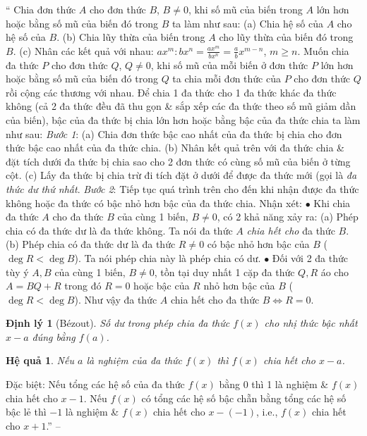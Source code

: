 \documentclass{article}
\numberwithin{equation}{section}
\newtheorem{dinhly}{Định lý}[section]
\newtheorem{hequa}{Hệ quả}[section]
\begin{document}
`` Chia đơn thức $A$ cho đơn thức $B$, $B\ne0$, khi số mũ của biến trong $A$ lớn hơn hoặc bằng số mũ của biến đó trong $B$ ta làm như sau: (a) Chia hệ số của $A$ cho hệ số của $B$. (b) Chia lũy thừa của biến trong $A$ cho lũy thừa của biến đó trong $B$. (c) Nhân các kết quả với nhau: $ax^m:bx^n = \frac{ax^m}{bx^n} = \frac{a}{b}x^{m-n}$, $m\ge n$.  Muốn chia đa thức $P$ cho đơn thức $Q$, $Q\ne0$, khi số mũ của mỗi biến ở đơn thức $P$ lớn hơn hoặc bằng số mũ của biến đó trong $Q$ ta chia mỗi đơn thức của $P$ cho đơn thức $Q$ rồi cộng các thương với nhau.  Để chia 1 đa thức cho 1 đa thức khác đa thức không (cả 2 đa thức đều đã thu gọn \& sắp xếp các đa thức theo số mũ giảm dần của biến), bậc của đa thức bị chia lớn hơn hoặc bằng bậc của đa thức chia ta làm như sau: \textit{Bước 1}: (a) Chia đơn thức bậc cao nhất của đa thức bị chia cho đơn thức bậc cao nhất của đa thức chia. (b) Nhân kết quả trên với đa thức chia \& đặt tích dưới đa thức bị chia sao cho 2 đơn thức có cùng số mũ của biến ở từng cột. (c) Lấy đa thức bị chia trừ đi tích đặt ở dưới để được đa thức mới (gọi là \textit{đa thức dư thứ nhất}. \textit{Bước 2}: Tiếp tục quá trình trên cho đến khi nhận được đa thức không hoặc đa thức có bậc nhỏ hơn bậc của đa thức chia.  Nhận xét: $\bullet$ Khi chia đa thức $A$ cho đa thức $B$ của cùng 1 biến, $B\ne0$, có 2 khả năng xảy ra: (a) Phép chia có đa thức dư là đa thức không. Ta nói đa thức $A$ \textit{chia hết cho} đa thức $B$. (b) Phép chia có đa thức dư là đa thức $R\ne0$ có bậc nhỏ hơn bậc của $B$ ($\deg R < \deg B$). Ta nói phép chia này là phép chia có dư. $\bullet$ Đối với 2 đa thức tùy ý $A,B$ của cùng 1 biến, $B\ne0$, tồn tại duy nhất 1 cặp đa thức $Q,R$ áo cho $A = BQ + R$ trong đó $R = 0$ hoặc bậc của $R$ nhỏ hơn bậc của $B$ ($\deg R < \deg B$). Như vậy đa thức $A$ chia hết cho đa thức $B\Leftrightarrow R = 0$.

\begin{dinhly}[B\'ezout]
	Số dư trong phép chia đa thức $f(x)$ cho nhị thức bậc nhất $x - a$ đúng bằng $f(a)$.
\end{dinhly}

\begin{hequa}
	Nếu $a$ là nghiệm của đa thức $f(x)$ thì $f(x)$ chia hết cho $x - a$.
\end{hequa}
Đặc biệt: Nếu tổng các hệ số của đa thức $f(x)$ bằng 0 thì 1 là nghiệm \& $f(x)$ chia hết cho $x - 1$. Nếu $f(x)$ có tổng các hệ số bậc chẵn bằng tổng các hệ số bậc lẻ thì $-1$ là nghiệm \& $f(x)$ chia hết cho $x - (-1)$, i.e., $f(x)$ chia hết cho $x + 1$.'' -- \cite[Chap. III, \S5, pp. 44--45]{Tuyen_Toan_7}
\end{document}
